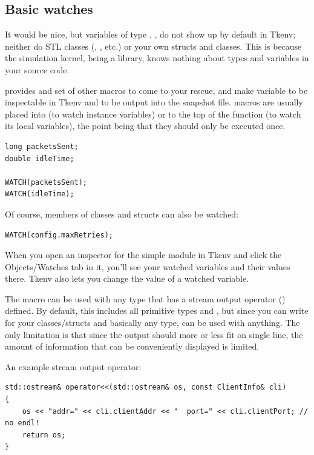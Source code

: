 \subsection{Basic watches}

It would be nice, but variables of type , , 
do not show up by default in Tkenv; neither do STL classes
(, , etc.) or your own structs and
classes. This is because the simulation kernel, being a library, knows
nothing about types and variables in your source code.

{\opp} provides  and set of other macros to come to your rescue,
and make variable to be inspectable in Tkenv and to be output into the snapshot
file.  macros are usually placed into
 (to watch instance variables) or to the top of the
 function (to watch its local variables), the point being
that they should only be executed once.

\begin{verbatim}
long packetsSent;
double idleTime;

WATCH(packetsSent);
WATCH(idleTime);
\end{verbatim}

Of course, members of classes and structs can also be watched:

\begin{verbatim}
WATCH(config.maxRetries);
\end{verbatim}

When you open an inspector for the simple module in Tkenv and click
the Objects/Watches tab in it, you'll see your watched variables
and their values there. Tkenv also lets you change the value of a
watched variable.

The  macro can be used with any type that has a
stream output operator () defined. By default,
this includes all primitive types and , but since
you can write  for your classes/structs and basically
any type,  can be used with anything. The only limitation
is that since the output should more or less fit on single line, the
amount of information that can be conveniently displayed is limited.

An example stream output operator:

\begin{verbatim}
std::ostream& operator<<(std::ostream& os, const ClientInfo& cli)
{
    os << "addr=" << cli.clientAddr << "  port=" << cli.clientPort; // no endl!
    return os;
}
\end{verbatim}

